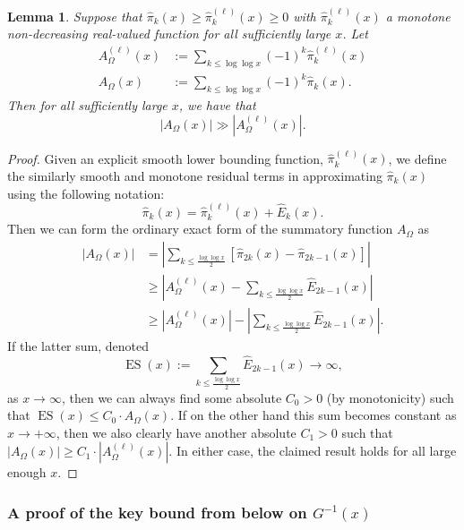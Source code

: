 \documentclass[11pt,reqno,a4letter]{article}
\numberwithin{figure}{section}
\numberwithin{table}{section}
\theoremstyle{plain}
\newtheorem{lemma}[theorem]{Lemma}
\numberwithin{theorem}{section}
\theoremstyle{definition}
\begin{document}
\begin{lemma} 
\label{lemma_lowerBoundsOnLambdaFuncParitySummFuncs} 
Suppose that $\widehat{\pi}_k(x) \geq \widehat{\pi}_k^{(\ell)}(x) \geq 0$ 
with $\widehat{\pi}_k^{(\ell)}(x)$ a monotone non-decreasing real-valued function 
for all sufficiently large $x$. 
Let 
\begin{align*} 
A_{\Omega}^{(\ell)}(x) & := \sum_{k \leq \log\log x} (-1)^k \widehat{\pi}_k^{(\ell)}(x) \\ 
A_{\Omega}(x) & := \sum_{k \leq \log\log x} (-1)^k \widehat{\pi}_k(x). 
\end{align*} 
Then for all sufficiently large $x$, we have that 
$$|A_{\Omega}(x)| \gg |A_{\Omega}^{(\ell)}(x)|.$$ 
\end{lemma} 
\begin{proof} 
Given an explicit smooth lower bounding function, $\widehat{\pi}_k^{(\ell)}(x)$, we define the 
similarly smooth and monotone residual terms in approximating $\widehat{\pi}_k(x)$ 
using the following notation: 
\[
\widehat{\pi}_k(x) = \widehat{\pi}_k^{(\ell)}(x) + \widehat{E}_k(x). 
\]
Then we can form the ordinary exact form of the summatory function $A_{\Omega}$ as 
\begin{align*} 
|A_{\Omega}(x)| & = \left\lvert \sum_{k \leq \frac{\log\log x}{2}} 
     \left[\widehat{\pi}_{2k}(x) - \widehat{\pi}_{2k-1}(x)\right] \right\rvert \\ 
     & \geq \left\lvert A_{\Omega}^{(\ell)}(x) - \sum_{k \leq \frac{\log\log x}{2}} \widehat{E}_{2k-1}(x) 
     \right\rvert \\ 
     & \geq 
     \left\lvert A_{\Omega}^{(\ell)}(x) \right\rvert - 
     \left\lvert \sum_{k \leq \frac{\log\log x}{2}} \widehat{E}_{2k-1}(x) 
     \right\rvert. 
\end{align*} 
If the latter sum, denoted 
$$\operatorname{ES}(x) := \sum_{k \leq \frac{\log\log x}{2}} \widehat{E}_{2k-1}(x) \rightarrow \infty,$$ as 
$x \rightarrow \infty$, then we can always find some absolute $C_0 > 0$ (by monotonicity) such that 
$\operatorname{ES}(x) \leq C_0 \cdot A_{\Omega}(x)$. If on the other hand this sum becomes constant as 
$x \rightarrow +\infty$, then we also clearly have another absolute $C_1 > 0$ such that 
$|A_{\Omega}(x)| \geq C_1 \cdot |A_{\Omega}^{(\ell)}(x)|$. 
In either case, the claimed result holds for all large enough $x$. 
\end{proof} 

\subsubsection{A proof of the key bound from below on $G^{-1}(x)$} 
\end{document}
